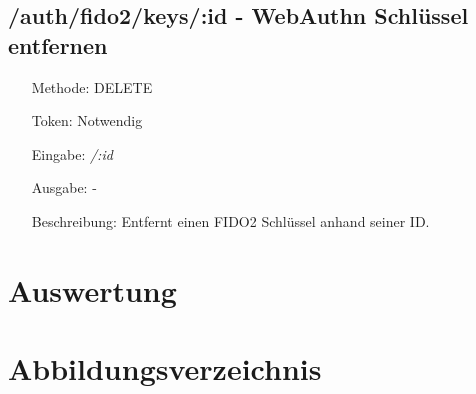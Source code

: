 \documentclass[journal]{IEEEtran}
\begin{document}
\subsection{/auth/fido2/keys/:id - WebAuthn Schlüssel entfernen}

\begin{itemize}
	\setlength{\leftskip}{1.5cm}
	\setlength{\itemsep}{0pt}
	\item[Methode:] DELETE
	\item[Token:] Notwendig
	\item[Eingabe:] \textit{/:id}
	\item[Ausgabe:] -
	\item[Beschreibung:] Entfernt einen FIDO2 Schlüssel anhand seiner ID.\@
\end{itemize}




\section{Auswertung}

\section{Abbildungsverzeichnis}



\end{document}
